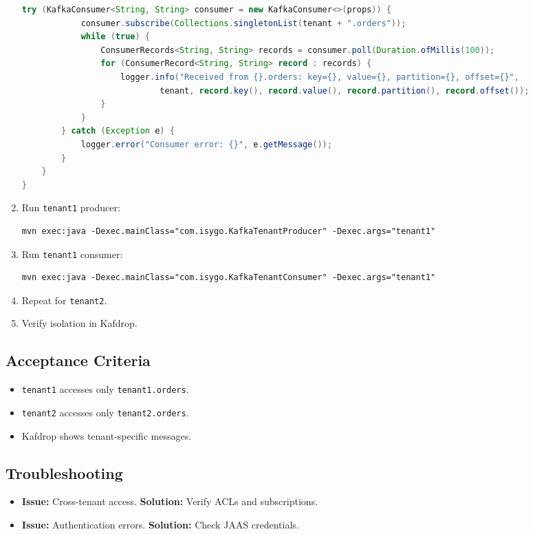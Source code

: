 \documentclass[12pt,a4paper]{report}
\begin{document}
\begin{enumerate}
\begin{lstlisting}[language=java]
        try (KafkaConsumer<String, String> consumer = new KafkaConsumer<>(props)) {
            consumer.subscribe(Collections.singletonList(tenant + ".orders"));
            while (true) {
                ConsumerRecords<String, String> records = consumer.poll(Duration.ofMillis(100));
                for (ConsumerRecord<String, String> record : records) {
                    logger.info("Received from {}.orders: key={}, value={}, partition={}, offset={}",
                            tenant, record.key(), record.value(), record.partition(), record.offset());
                }
            }
        } catch (Exception e) {
            logger.error("Consumer error: {}", e.getMessage());
        }
    }
}
\end{lstlisting}
    \item Run \texttt{tenant1} producer:
    \begin{lstlisting}
mvn exec:java -Dexec.mainClass="com.isygo.KafkaTenantProducer" -Dexec.args="tenant1"
    \end{lstlisting}
    \item Run \texttt{tenant1} consumer:
    \begin{lstlisting}
mvn exec:java -Dexec.mainClass="com.isygo.KafkaTenantConsumer" -Dexec.args="tenant1"
    \end{lstlisting}
    \item Repeat for \texttt{tenant2}.
    \item Verify isolation in Kafdrop.
\end{enumerate}

\subsection{Acceptance Criteria}
\begin{itemize}
    \item \texttt{tenant1} accesses only \texttt{tenant1.orders}.
    \item \texttt{tenant2} accesses only \texttt{tenant2.orders}.
    \item Kafdrop shows tenant-specific messages.
\end{itemize}

\subsection{Troubleshooting}
\begin{itemize}
    \item \textbf{Issue:} Cross-tenant access.
      \textbf{Solution:} Verify ACLs and subscriptions.
    \item \textbf{Issue:} Authentication errors.
      \textbf{Solution:} Check JAAS credentials.
\end{itemize}
\end{document}
